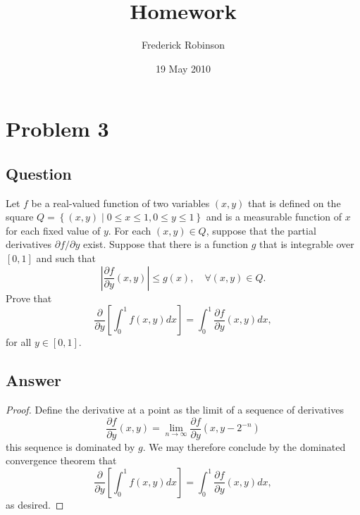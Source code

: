 \documentclass[10pt]{article}
\title{Homework}
\author{Frederick Robinson}
\date{19 May 2010}
\begin{document}

   \maketitle

\setcounter{tocdepth}{2} 

\section{Problem 3}
\subsection{Question}
Let $f$ be a real-valued function of two variables $(x,y)$ that is defined on the square $Q = \left\{ (x,y) \mid 0 \leq x \leq 1, 0 \leq y \leq 1\right\}$ and is a measurable function of $x$ for each fixed value of $y$. For each $(x,y) \in Q$, suppose that the partial derivatives $\partial f / \partial y$ exist. Suppose that there is a function $g$ that is integrable over $[0,1]$ and such that
\[\left| \frac{\partial f}{\partial y} (x,y)\right| \leq g(x), \quad \forall(x,y) \in Q.\]
Prove that
\[\frac{\partial}{\partial y} \left[ \int_0^1 f(x,y) dx \right] = \int_0^1 \frac{\partial f}{\partial y} (x,y) dx, \]
for all $y \in [0,1]$.
\subsection{Answer}
\begin{proof}
Define the derivative at a point as the limit of a sequence of derivatives
\[\frac{\partial f}{\partial y} (x,y) = \lim_{n \to \infty} \frac{\partial f}{ \partial y} (x, y- 2^{-n}) \]
this sequence is dominated by $g$. We may therefore conclude by the dominated convergence theorem that 
\[\frac{\partial}{\partial y} \left[ \int_0^1 f(x,y) dx \right] = \int_0^1 \frac{\partial f}{\partial y} (x,y) dx, \]
as desired.
\end{proof}
\end{document}
